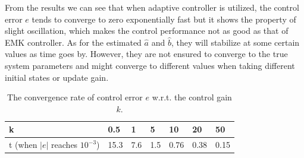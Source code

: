 \documentclass[12pt,a4paper]{article}
\begin{document}
\indent From the results we can see that when adaptive controller is utilized, the control error $e$ tends to converge to zero exponentially fast but it shows the property of slight oscillation, which makes the control performance not as good as that of EMK controller. As for the estimated $\hat{a}$ and $\hat{b}$, they will stabilize at some certain values as time goes by. However, they are not ensured to converge to the true system parameters and might converge to different values when taking different initial states or update gain.

\begin{table}
\caption{The convergence rate of control error $e$ w.r.t. the control gain $k$.}
\label{emk_table}
\centering
\begin{tabular}{lllllll}
\hline
k &0.5 &1 &5 &10 &20 &50\\
\hline
t (when $|e|$ reaches $10^{-3}$) &15.3	&7.6 &1.5 &0.76 &0.38 &0.15\\
\hline
\end{tabular}
\end{table}
\end{document}
